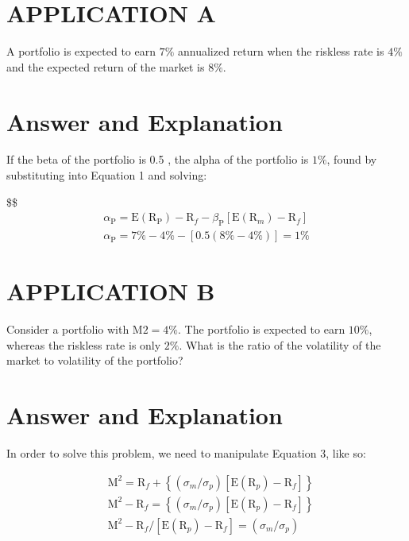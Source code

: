 \documentclass[11pt]{article}
\begin{document}
\section*{APPLICATION A}
A portfolio is expected to earn $7 \%$ annualized return when the riskless rate is $4 \%$ and the expected return of the market is $8 \%$.

\section*{Answer and Explanation}
If the beta of the portfolio is 0.5 , the alpha of the portfolio is $1 \%$, found by substituting into Equation 1 and solving:

\$\$\\
\[
\begin{gathered}
\alpha_{\mathrm{P}}=\mathrm{E}\left(\mathrm{R}_{\mathrm{P}}\right)-\mathrm{R}_{f}-\beta_{\mathrm{P}}\left[\mathrm{E}\left(\mathrm{R}_{m}\right)-\mathrm{R}_{f}\right] \\
\alpha_{\mathrm{P}}=7 \%-4 \%-[0.5(8 \%-4 \%)]=1 \%
\end{gathered}
\]

\section*{APPLICATION B}
Consider a portfolio with $\mathrm{M} 2=4 \%$. The portfolio is expected to earn $10 \%$, whereas the riskless rate is only $2 \%$. What is the ratio of the volatility of the market to volatility of the portfolio?

\section*{Answer and Explanation}
In order to solve this problem, we need to manipulate Equation 3, like so:

$$
\begin{aligned}
& \mathrm{M}^{2}=\mathrm{R}_{f}+\left\{\left(\sigma_{m} / \sigma_{p}\right)\left[\mathrm{E}\left(\mathrm{R}_{p}\right)-\mathrm{R}_{f}\right]\right\} \\
& \mathrm{M}^{2}-\mathrm{R}_{f}=\left\{\left(\sigma_{m} / \sigma_{p}\right)\left[\mathrm{E}\left(\mathrm{R}_{p}\right)-\mathrm{R}_{f}\right]\right\} \\
& \mathrm{M}^{2}-\mathrm{R}_{f} /\left[\mathrm{E}\left(\mathrm{R}_{p}\right)-\mathrm{R}_{f}\right]=\left(\sigma_{m} / \sigma_{p}\right)
\end{aligned}
$$
\end{document}
